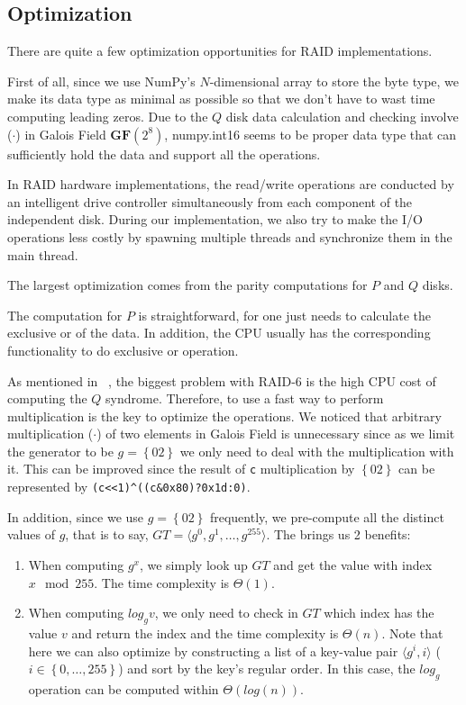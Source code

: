 \subsection{Optimization}

There are quite a few optimization opportunities for RAID implementations.

First of all, since we use NumPy's $N$-dimensional array to store the byte type, we make its data type as minimal as possible so that we don't have to wast time computing leading zeros. Due to the $Q$ disk data calculation and checking involve ($\cdot$) in Galois Field $\mathbf{GF}(2^8)$, \textsf{numpy.int16} seems to be proper data type that can sufficiently hold the data and support all the operations.

In RAID hardware implementations, the read/write operations are conducted by an intelligent drive controller simultaneously from each component of the independent disk. During our implementation, we also try to make the I/O operations less costly by spawning multiple threads and synchronize them in the main thread.

The largest optimization comes from the parity computations for $P$ and $Q$ disks.

The computation for $P$ is straightforward, for one just needs to calculate the exclusive or of the data. In addition, the CPU usually has the corresponding functionality to do exclusive or operation.

As mentioned in ~\cite{raid6math}, the biggest problem with RAID-6 is the high CPU cost of computing the $Q$ syndrome. Therefore, to use a fast way to perform multiplication is the key to optimize the operations. We noticed that arbitrary multiplication ($\cdot$) of two elements in Galois Field is unnecessary since as we limit the generator to be $g=\left\{02\right\}$ we only need to deal with the multiplication with it. This can be improved since the result of \verb|c| multiplication by $\left\{02\right\}$ can be represented by \verb|(c<<1)^((c&0x80)?0x1d:0)|.

In addition, since we use $g=\left\{02\right\}$ frequently, we pre-compute all the distinct values of $g$, that is to say, $GT=\langle g^0, g^1, \ldots, g^{255}\rangle$. The brings us 2 benefits:

\begin{enumerate}
	\item When computing $g^{x}$, we simply look up $GT$ and get the value with index $x \mod 255$. The time complexity is $\Theta(1)$.
    \item When computing $log_{g}v$, we only need to check in $GT$ which index has the value $v$ and return the index and the time complexity is $\Theta(n)$. Note that here we can also optimize by constructing a list of a key-value pair $\langle g^{i}, i\rangle$ ($i\in\left\{0,\ldots,255\right\}$) and sort by the key's regular order. In this case, the $log_{g}$ operation can be computed within $\Theta(log{(n)})$.
\end{enumerate}

